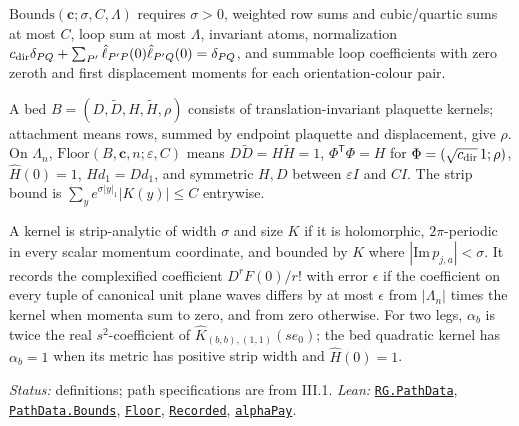 \documentclass[
  letterpaper,
  11pt]{article}
\begin{document}
\(\mathrm{Bounds}(\mathbf c;\sigma,C,\Lambda)\) requires \(\sigma>0\),
weighted row sums and cubic/quartic sums at most \(C\), loop sum at most
\(\Lambda\), invariant atoms, normalization
\(c_{\rm dir}\delta_{PQ}+\sum_{P'}\hat\ell_{P'P}(0)\hat\ell_{P'Q}(0)=\delta_{PQ}\),
and summable loop coefficients with zero zeroth and first displacement
moments for each orientation-colour pair.

A bed \(B=(D,\tilde D,H,\tilde H,\rho)\) consists of
translation-invariant plaquette kernels; attachment means rows, summed
by endpoint plaquette and displacement, give \(\rho\). On \(\Lambda_n\),
\(\mathrm{Floor}(B,\mathbf c,n;\varepsilon,C)\) means
\(D\tilde D=H\tilde H=1\), \(\Phi^{\mathsf T}\Phi=H\) for
\(\Phi=(\sqrt{c_{\rm dir}}\,1;\rho)\), \(\hat H(0)=1\), \(Hd_1=Dd_1\),
and symmetric \(H,D\) between \(\varepsilon I\) and \(CI\). The strip
bound is \(\sum_y e^{\sigma|y|_1}|K(y)|\le C\) entrywise.

A kernel is strip-analytic of width \(\sigma\) and size \(K\) if it is
holomorphic, \(2\pi\)-periodic in every scalar momentum coordinate, and
bounded by \(K\) where \(|\mathrm{Im}\,p_{j,a}|<\sigma\). It records the
complexified coefficient \(D^rF(0)/r!\) with error \(\epsilon\) if the
coefficient on every tuple of canonical unit plane waves differs by at
most \(\epsilon\) from \(|\Lambda_n|\) times the kernel when momenta sum
to zero, and from zero otherwise. For two legs, \(\alpha_b\) is twice
the real \(s^2\)-coefficient of \(\hat K_{(b,b),(1,1)}(se_0)\); the bed
quadratic kernel has \(\alpha_b=1\) when its metric has positive strip
width and \(\hat H(0)=1\).

\emph{Status:} definitions; path specifications are from III.1.
\emph{Lean:}
\href{https://github.com/yang-mills-group/OpenAI-YM-20261028/blob/3456e5e75cf8d4cd558955a5c7638fba2d68f464/YM/RG/PathActions.lean\#L150-L154}{\texttt{RG.PathData}},
\href{https://github.com/yang-mills-group/OpenAI-YM-20261028/blob/3456e5e75cf8d4cd558955a5c7638fba2d68f464/YM/RG/PathActions.lean\#L173-L185}{\texttt{PathData.Bounds}},
\href{https://github.com/yang-mills-group/OpenAI-YM-20261028/blob/3456e5e75cf8d4cd558955a5c7638fba2d68f464/YM/PREC/Stacks.lean\#L61-L68}{\texttt{Floor}},
\href{https://github.com/yang-mills-group/OpenAI-YM-20261028/blob/3456e5e75cf8d4cd558955a5c7638fba2d68f464/YM/Next/STATIONARY/Lift/Pathways.lean\#L491-L492}{\texttt{Recorded}},
\href{https://github.com/yang-mills-group/OpenAI-YM-20261028/blob/3456e5e75cf8d4cd558955a5c7638fba2d68f464/YM/Next/STATIONARY/Films/LeadingRay.lean\#L699}{\texttt{alphaPay}}.
\end{document}
